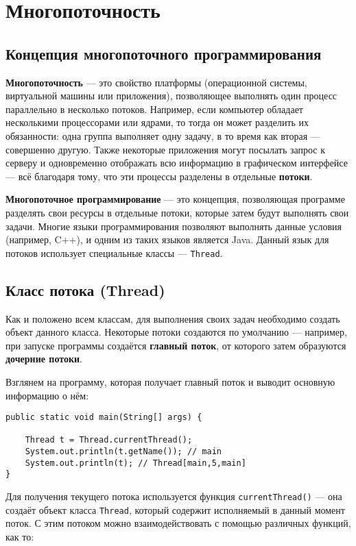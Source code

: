 \newpage
\chapter{Многопоточность}

\section{Концепция многопоточного программирования}

\textbf{Многопоточность} — это свойство платформы (операционной системы, виртуальной машины или приложения), позволяющее выполнять один процесс параллельно в несколько потоков. Например, если компьютер обладает несколькими процессорами или ядрами, то тогда он может разделить их обязанности: одна группа выполняет одну задачу, в то время как вторая — совершенно другую. Также некоторые приложения могут посылать запрос к серверу и одновременно отображать всю информацию в графическом интерфейсе — всё благодаря тому, что эти процессы разделены в отдельные \textbf{потоки}.

\textbf{Многопоточное программирование} — это концепция, позволяющая программе разделять свои ресурсы в отдельные потоки, которые затем будут выполнять свои задачи. Многие языки программирования позволяют выполнять данные условия (например, C++), и одним из таких языков является Java. Данный язык для потоков использует специальные классы — \verb|Thread|.

\section{Класс потока (Thread)}

Как и положено всем классам, для выполнения своих задач необходимо создать объект данного класса. Некоторые потоки создаются по умолчанию — например, при запуске программы создаётся \textbf{главный поток}, от которого затем образуются \textbf{дочерние потоки}.

Взглянем на программу, которая получает главный поток и выводит основную информацию о нём:

\begin{lstlisting}
public static void main(String[] args) {
         
    Thread t = Thread.currentThread();
    System.out.println(t.getName()); // main
    System.out.println(t); // Thread[main,5,main]
}
\end{lstlisting}

Для получения текущего потока используется функция \verb|currentThread()| — она создаёт объект класса \verb|Thread|, который содержит исполняемый в данный момент поток. С этим потоком можно взаимодействовать с помощью различных функций, как то:


